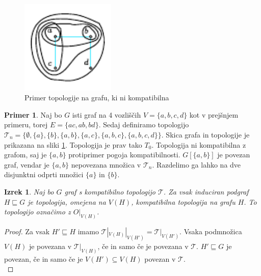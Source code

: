 \documentclass[a4paper, 12pt]{book}
\newtheorem{theorem}{Izrek}[section]
\theoremstyle{definition}
\newtheorem{example}{Primer}[section]
\theoremstyle{remark}
\begin{document}
\begin{figure}[h]
  \begin{center}
  \includegraphics[width=0.4\textwidth]{incompatible-topology.pdf}
  \end{center}
  \caption{Primer topologije na grafu, ki ni kompatibilna}
  \label{incompat-topol}
\end{figure}

\begin{example}
  Naj bo $G$ isti graf na 4 vozliščih $V=\{a,b,c,d\}$ kot v prejšnjem primeru, torej $E=\{ac,ab,bd\}$.
  Sedaj definiramo topologijo $\mathcal{T}_n = \{\emptyset, \{a\}, \{b\}, \{a, b\}, \{a, c\}, \{a, b, c\}, \{a, b, c, d\}\}$.
  Skica grafa in topologije je prikazana na sliki \ref{incompat-topol}. Topologija je prav tako $T_0$.
  Topologija ni kompatibilna z grafom, saj je $\{a,b\}$ protiprimer pogoja kompatibilnosti. $G[\{a,b\}]$
  je povezan graf, vendar je $\{a,b\}$ nepovezana množica v $\mathcal{T}_n$. Razdelimo ga lahko na dve
  disjunktni odprti množici $\{a\}$ in $\{b\}$.
\end{example}
\begin{theorem}\label{theorem1}
  Naj bo $G$ graf s kompatibilno topologijo $\mathcal{T}$. Za vsak induciran podgraf
  $H \sqsubseteq G$ je topologija, omejena na $V(H)$, kompatibilna topologija
  na grafu $H$. To topologijo označimo z $O|_{V(H)}$.
\end{theorem}
\begin{proof}
  Za vsak $H' \sqsubseteq H$ imamo $\mathcal{T}|_{V(H)}|_{V(H')} = \mathcal{T}|_{V(H')}$. 
  Vsaka podmnožica $V(H)$ je povezana v $\mathcal{T}|_{V(H)}$, če in samo če je povezana v $\mathcal{T}$.
  $H' \sqsubseteq G$ je povezan, če in samo če je $V(H') \subseteq V(H)$ povezan v $\mathcal{T}$.\\
\end{proof}
\end{document}
